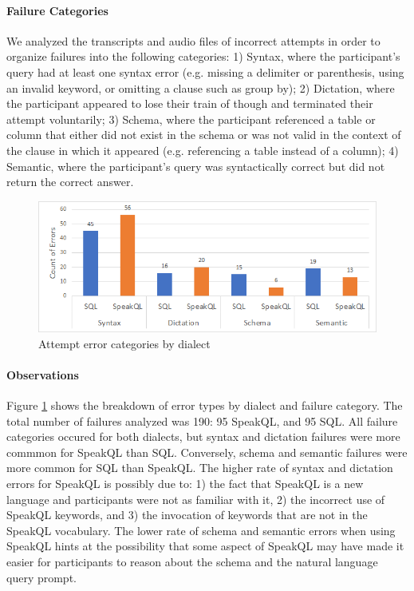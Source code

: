 \paragraph{\textbf{Failure Categories}}
We analyzed the transcripts and audio files of incorrect attempts in order to organize failures into the following categories: 1) Syntax, where the participant's query had at least one syntax error (e.g. missing a delimiter or parenthesis, using an invalid keyword, or omitting a clause such as group by); 2) Dictation, where the participant appeared to lose their train of though and terminated their attempt voluntarily; 3) Schema, where the participant referenced a table or column that either did not exist in the schema or was not valid in the context of the clause in which it appeared (e.g. referencing a table instead of a column); 4) Semantic, where the participant's query was syntactically correct but did not return the correct answer.

\begin{figure}
  \centering
  \includegraphics[width=0.8\linewidth]{figures/error-type-counts.png}
  \caption{Attempt error categories by dialect}
  \label{fig:errorcounts}
\end{figure}
\paragraph{\textbf{Observations}}

Figure \ref{fig:errorcounts} shows the breakdown of error types by dialect and failure category. The total number of failures analyzed was 190: 95 SpeakQL, and 95 SQL. All failure categories occured for both dialects, but syntax and dictation failures were more commmon for SpeakQL than SQL. Conversely, schema and semantic failures were more common for SQL than SpeakQL. The higher rate of syntax and dictation errors for SpeakQL is possibly due to: 1) the fact that SpeakQL is a new language and participants were not as familiar with it, 2) the incorrect use of SpeakQL keywords, and 3) the invocation of keywords that are not in the SpeakQL vocabulary. The lower rate of schema and semantic errors when using SpeakQL hints at the possibility that some aspect of SpeakQL may have made it easier for participants to reason about the schema and the natural language query prompt.



